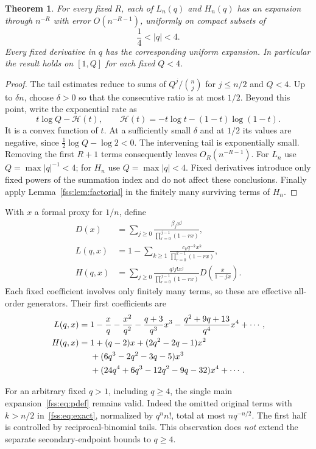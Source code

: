 \documentclass[11pt]{article}
\newtheorem{theorem}{Theorem}
\begin{document}
\begin{theorem}\label{fss:thm:endpoint}
For every fixed $R$, each of $L_n(q)$ and $H_n(q)$ has an expansion through $n^{-R}$ with error $O(n^{-R-1})$, uniformly on compact subsets of
\[
 \frac14<|q|<4.
\]
Every fixed derivative in $q$ has the corresponding uniform expansion. In particular the result holds on $[1,Q]$ for each fixed $Q<4$.
\end{theorem}
\begin{proof}
The tail estimates reduce to sums of $Q^j/\binom nj$ for $j\le n/2$ and $Q<4$. Up to $\delta n$, choose $\delta>0$ so that the consecutive ratio is at most $1/2$. Beyond this point, write the exponential rate as
\[
 t\log Q-\mathcal H(t),\qquad
 \mathcal H(t)=-t\log t-(1-t)\log(1-t).
\]
It is a convex function of $t$. At a sufficiently small $\delta$ and at $1/2$ its values are negative, since $\frac12\log Q-\log2<0$. The intervening tail is exponentially small. Removing the first $R+1$ terms consequently leaves $O_R(n^{-R-1})$. For $L_n$ use $Q=\max|q|^{-1}<4$; for $H_n$ use $Q=\max|q|<4$. Fixed derivatives introduce only fixed powers of the summation index and do not affect these conclusions. Finally apply Lemma~\ref{fss:lem:factorial} in the finitely many surviving terms of $H_n$.
\end{proof}
With $x$ a formal proxy for $1/n$, define
\begin{align}
 D(x)&=\sum_{j\ge0}\frac{\beta_jx^j}{\prod_{r=0}^{j-1}(1-rx)},\label{fss:eq:Dformal}\\
 L(q,x)&=1-\sum_{k\ge1}\frac{c_kq^{-k}x^k}{\prod_{r=0}^{k-1}(1-rx)},\label{fss:eq:Lformal}\\
 H(q,x)&=\sum_{j\ge0}\frac{q^j j!x^j}{\prod_{r=0}^{j-1}(1-rx)}
 D\!\left(\frac{x}{1-jx}\right).\label{fss:eq:Hformal}
\end{align}
Each fixed coefficient involves only finitely many terms, so these are effective all-order generators. Their first coefficients are
\begin{align}
 L(q,x)={}&1-\frac{x}{q}-\frac{x^2}{q^2}
 -\frac{q+3}{q^3}x^3-\frac{q^2+9q+13}{q^4}x^4+\cdots,\label{fss:eq:Lcoeff}\\
 H(q,x)={}&1+(q-2)x+(2q^2-2q-1)x^2\notag\\
 &+(6q^3-2q^2-3q-5)x^3\notag\\
 &+(24q^4+6q^3-12q^2-9q-32)x^4+\cdots.\label{fss:eq:Hcoeff}
\end{align}

For an arbitrary fixed $q>1$, including $q\ge4$, the single main expansion~\eqref{fss:eq:pdef} remains valid. Indeed the omitted original terms with $k>n/2$ in~\eqref{fss:eq:exact}, normalized by $q^nn!$, total at most $nq^{-n/2}$. The first half is controlled by reciprocal-binomial tails. This observation does \emph{not} extend the separate secondary-endpoint bounds to $q\ge4$.
\end{document}

